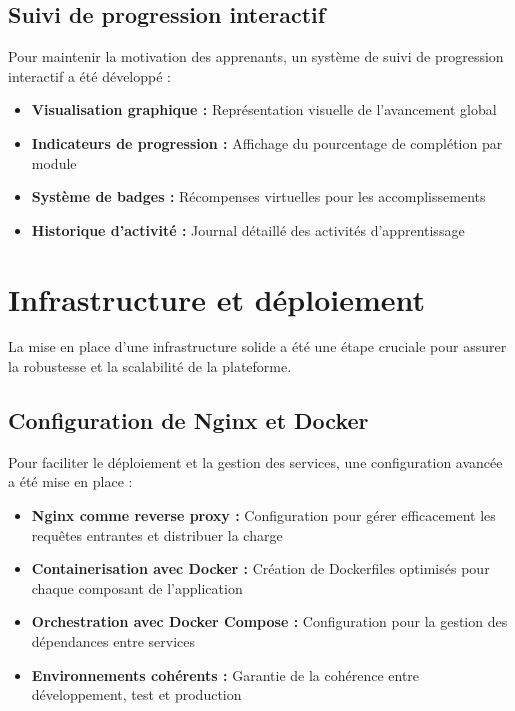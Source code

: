 \subsection{Suivi de progression interactif}

Pour maintenir la motivation des apprenants, un système de suivi de progression interactif a été développé :

\begin{itemize}
  \item \textbf{Visualisation graphique :} Représentation visuelle de l'avancement global
  \item \textbf{Indicateurs de progression :} Affichage du pourcentage de complétion par module
  \item \textbf{Système de badges :} Récompenses virtuelles pour les accomplissements
  \item \textbf{Historique d'activité :} Journal détaillé des activités d'apprentissage
\end{itemize}

\section{Infrastructure et déploiement}

La mise en place d'une infrastructure solide a été une étape cruciale pour assurer la robustesse et la scalabilité de la plateforme.

\subsection{Configuration de Nginx et Docker}

Pour faciliter le déploiement et la gestion des services, une configuration avancée a été mise en place :

\begin{itemize}
  \item \textbf{Nginx comme reverse proxy :} Configuration pour gérer efficacement les requêtes entrantes et distribuer la charge
  \item \textbf{Containerisation avec Docker :} Création de Dockerfiles optimisés pour chaque composant de l'application
  \item \textbf{Orchestration avec Docker Compose :} Configuration pour la gestion des dépendances entre services
  \item \textbf{Environnements cohérents :} Garantie de la cohérence entre développement, test et production
\end{itemize}

